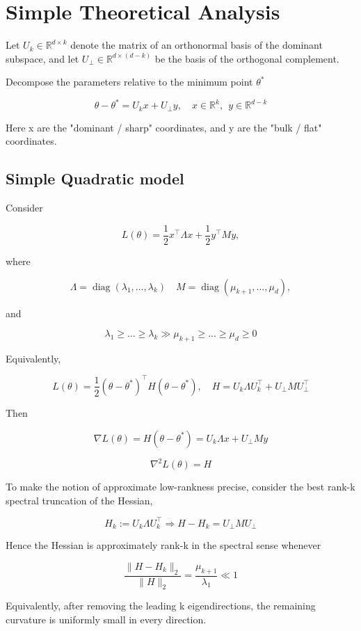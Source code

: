 \documentclass[conference]{IEEEtran}
\begin{document}
\section{Simple Theoretical Analysis}

Let $U_k\in\mathbb{R}^{d\times k}$ denote the matrix of an orthonormal basis of the dominant subspace, and let $U_\bot\in \mathbb{R}^{d\times (d-k)}$ be the basis of the orthogonal complement.

Decompose the parameters relative to the minimum point $\theta^*$

\[
\theta - \theta^* = U_kx+U_\bot y,\quad x \in \mathbb{R}^k, \ \ y\in\mathbb{R}^{d-k}
\]

Here x are the "dominant / sharp" coordinates, and y are the "bulk / flat" coordinates.

\subsection{Simple Quadratic model}

Consider

\[
L(\theta) = \frac{1}{2}x^\top \Lambda x + \frac{1}{2}y^\top My,
\]

where

\[
\Lambda = \operatorname{diag}(\lambda_1,\dots,\lambda_k)\quad M = \operatorname{diag}(\mu_{k+1},\dots,\mu_{d}),
\]

and

\[
\lambda_1 \ge \dots\ge \lambda_k \gg \mu_{k+1}\ge\dots\ge\mu_{d}\ge 0
\]

Equivalently,

\[
L(\theta) = \frac{1}{2}(\theta-\theta^*)^\top H(\theta-\theta^*),\quad H = U_k\Lambda U_k^\top + U_\bot MU_\bot^\top
\]

Then

\[
\nabla L(\theta) = H(\theta-\theta^*) = U_k\Lambda x+U_\bot M y
\]

\[
\nabla^2L(\theta) = H
\]

To make the notion of approximate low-rankness precise, consider the best rank-k spectral truncation of the Hessian,

\[
H_k :=U_k\Lambda U_k^\top\Rightarrow H-H_k = U_\bot M U_\bot
\]

Hence the Hessian is approximately rank-k in the spectral sense whenever

\[
\frac{\|H-H_k\|_2}{\|H\|_2} = \frac{\mu_{k+1}}{\lambda_1} \ll 1
\]

Equivalently, after removing the leading k eigendirections, the remaining curvature is uniformly small in every direction.
\end{document}
